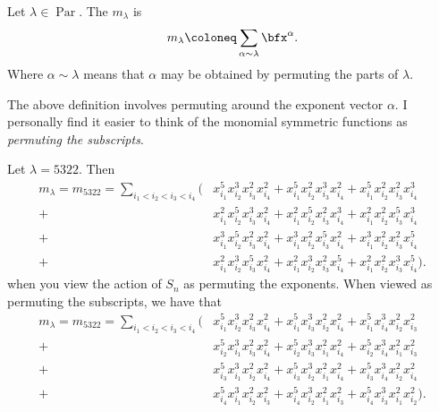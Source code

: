 \documentclass{article}
\DeclareMathOperator{\Par}{Par}
\begin{document}
\begin{definition}
    Let $\lambda \in \Par$. The  $m_\lambda$ is 
    \[
        m_\lambda \coloneq \sum_{\alpha \sim \lambda} \bfx^\alpha.
    \]
    Where $\alpha \sim \lambda$ means that $\alpha$ may be obtained by permuting the parts of $\lambda$.
\end{definition}

The above definition involves permuting around the exponent vector $\alpha$. 
I personally find it easier to think of the monomial symmetric functions as \textit{permuting the subscripts}. 

\begin{example}
    Let $\lambda = 5322$. Then
    \begin{align*}
        m_\lambda = m_{5322} = \sum_{i_1<i_2<i_3<i_4} \Big(&x_{i_1}^5x_{i_2}^3x_{i_3}^2x_{i_4}^2 + x_{i_1}^5x_{i_2}^2x_{i_3}^3x_{i_4}^2 + x_{i_1}^5x_{i_2}^2x_{i_3}^2x_{i_4}^3 \\ 
            + &x_{i_1}^2x_{i_2}^5x_{i_3}^3x_{i_4}^2 + x_{i_1}^2x_{i_2}^5x_{i_3}^2x_{i_4}^3 + x_{i_1}^2x_{i_2}^2x_{i_3}^5x_{i_4}^3  \\
            + &x_{i_1}^3x_{i_2}^5x_{i_3}^2x_{i_4}^2 + x_{i_1}^3x_{i_2}^2x_{i_3}^5x_{i_4}^2 + x_{i_1}^3x_{i_2}^2x_{i_3}^2x_{i_4}^5  \\
        + &x_{i_1}^2x_{i_2}^3x_{i_3}^5x_{i_4}^2 + x_{i_1}^2x_{i_2}^3x_{i_3}^2x_{i_4}^5 + x_{i_1}^2x_{i_2}^2x_{i_3}^3x_{i_4}^5 \Big).
    \end{align*}
    when you view the action of $S_n$ as permuting the exponents. When viewed as permuting the subscripts, we have that
    \begin{align*}
        m_\lambda = m_{5322} = \sum_{i_1<i_2<i_3<i_4} \Big(
        &x_{i_1}^5x_{i_2}^3x_{i_3}^2x_{i_4}^2
        + x_{i_1}^5x_{i_3}^3x_{i_2}^2x_{i_4}^2
        + x_{i_1}^5x_{i_4}^3x_{i_2}^2x_{i_3}^2 \\
        + &x_{i_2}^5x_{i_1}^3x_{i_3}^2x_{i_4}^2
        + x_{i_2}^5x_{i_3}^3x_{i_1}^2x_{i_4}^2
        + x_{i_2}^5x_{i_4}^3x_{i_1}^2x_{i_3}^2 \\
        + &x_{i_3}^5x_{i_1}^3x_{i_2}^2x_{i_4}^2
        + x_{i_3}^5x_{i_2}^3x_{i_1}^2x_{i_4}^2
        + x_{i_3}^5x_{i_4}^3x_{i_2}^2x_{i_4}^2 \\
        + &x_{i_4}^5x_{i_1}^3x_{i_2}^2x_{i_3}^2
        + x_{i_4}^5x_{i_2}^3x_{i_1}^2x_{i_3}^2
        + x_{i_4}^5x_{i_3}^3x_{i_1}^2x_{i_2}^2
    \Big).
    \end{align*}
\end{example}
\end{document}
